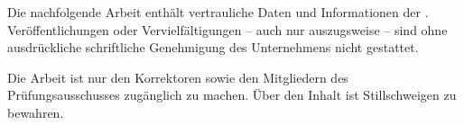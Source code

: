 Die nachfolgende Arbeit enthält vertrauliche Daten und Informationen der \ausbildungsbetrieb.
Veröffentlichungen oder Vervielfältigungen -- auch nur auszugsweise -- sind ohne ausdrückliche schriftliche Genehmigung des Unternehmens nicht gestattet.

Die Arbeit ist nur den Korrektoren sowie den Mitgliedern des Prüfungsausschusses zugänglich zu machen.
Über den Inhalt ist Stillschweigen zu bewahren.